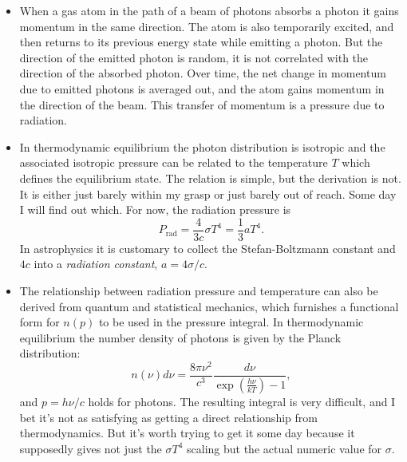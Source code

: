 \documentclass[10pt,amsmath,amssymb,aps,pra]{revtex4-2}
\newcommand{\sub}[1]{_{\text{#1}}}
\begin{document}
\begin{itemize}
\item When a gas atom in the path of a beam of photons absorbs a photon it gains
momentum in the same direction. The atom is also temporarily excited, and then
returns to its previous energy state while emitting a photon. But the direction
of the emitted photon is random, it is not correlated with the direction of the
absorbed photon. Over time, the net change in momentum due to emitted photons is
averaged out, and the atom gains momentum in the direction of the beam. This
transfer of momentum is a pressure due to radiation.

\item In thermodynamic equilibrium the photon distribution is isotropic and the
associated isotropic pressure can be related to the temperature $T$ which
defines the equilibrium state. The relation is simple, but the derivation is
not. It is either just barely within my grasp or just barely out of reach. Some
day I will find out which. For now, the radiation pressure is
\begin{equation}
P\sub{rad} = \frac{4}{3c}\sigma{}T^4 = \frac{1}{3}aT^4.
\end{equation}
In astrophysics it is customary to collect the Stefan-Boltzmann constant and
$4c$ into a \emph{radiation constant}, $a=4\sigma/c$.

\item The relationship between radiation pressure and temperature can also be
derived from quantum and statistical mechanics, which furnishes a functional
form for $n(p)$ to be used in the pressure integral. In thermodynamic
equilibrium the number density of photons is given by the Planck distribution:
\begin{equation}\label{eq:planck_nu}
n(\nu)d\nu = \frac{8\pi\nu^2}{c^3}\frac{d\nu}{\exp(\frac{h\nu}{kT}) - 1},
\end{equation}
and $p=h\nu/c$ holds for photons. The resulting integral is very difficult, and
I bet it's not as satisfying as getting a direct relationship from
thermodynamics. But it's worth trying to get it some day because it supposedly
gives not just the $\sigma{}T^4$ scaling but the actual numeric value for
$\sigma$.
\end{itemize}
\end{document}

